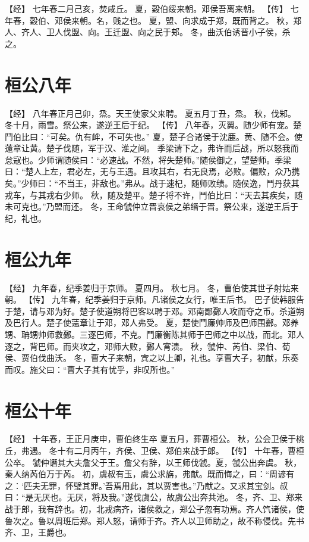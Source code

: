 \documentclass[a4paper,12pt,UTF8,twoside]{ctexbook}
\begin{document}
【经】
七年春二月己亥，焚咸丘。
夏，穀伯绥来朝。邓侯吾离来朝。
【传】
七年春，穀伯、邓侯来朝。名，贱之也。
夏，盟、向求成于郑，既而背之。
秋，郑人、齐人、卫人伐盟、向。王迁盟、向之民于郏。
冬，曲沃伯诱晋小子侯，杀之。

\section{桓公八年}

【经】
八年春正月己卯，烝。天王使家父来聘。
夏五月丁丑，烝。
秋，伐邾。
冬十月，雨雪。祭公来，遂逆王后于纪。
【传】
八年春，灭翼。随少师有宠。楚鬥伯比曰：“可矣。仇有衅，不可失也。”
夏，楚子合诸侯于沈鹿。黄、随不会。使薳章让黄。楚子伐随，军于汉、淮之间。
季梁请下之，弗许而后战，所以怒我而怠寇也。少师谓随侯曰：“必速战。不然，将失楚师。”随侯御之，望楚师。季梁曰：“楚人上左，君必左，无与王遇。且攻其右，右无良焉，必败。偏败，众乃携矣。”少师曰：“不当王，非敌也。”弗从。战于速杞，随师败绩。随侯逸，鬥丹获其戎车，与其戎右少师。
秋，随及楚平。楚子将不许，鬥伯比曰：“天去其疾矣，随未可克也。”乃盟而还。
冬，王命虢仲立晋哀侯之弟缗于晋。祭公来，遂逆王后于纪，礼也。

\section{桓公九年}

【经】
九年春，纪季姜归于京师。
夏四月。
秋七月。
冬，曹伯使其世子射姑来朝。
【传】
九年春，纪季姜归于京师。凡诸侯之女行，唯王后书。
巴子使韩服告于楚，请与邓为好。楚子使道朔将巴客以聘于邓。邓南鄙鄾人攻而夺之币。杀道朔及巴行人。楚子使薳章让于邓，邓人弗受。
夏，楚使鬥廉帅师及巴师围鄾。邓养甥、聃甥帅师救鄾。三逐巴师，不克。鬥廉衡陈其师于巴师之中以战，而北。邓人逐之，背巴师。而夹攻之，邓师大败，鄾人宵溃。
秋，虢仲、芮伯、梁伯、荀侯、贾伯伐曲沃。
冬，曹大子来朝，宾之以上卿，礼也。享曹大子，初献，乐奏而叹。施父曰：“曹大子其有忧乎，非叹所也。”

\section{桓公十年}

【经】
十年春，王正月庚申，曹伯终生卒
夏五月，葬曹桓公。
秋，公会卫侯于桃丘，弗遇。
冬十有二月丙午，齐侯、卫侯、郑伯来战于郎。
【传】
十年春，曹桓公卒。
虢仲谮其大夫詹父于王。詹父有辞，以王师伐虢。夏，虢公出奔虞。
秋，秦人纳芮伯万于芮。
初，虞叔有玉，虞公求旃，弗献。既而悔之，曰：“周谚有之：‘匹夫无罪，怀璧其罪。’吾焉用此，其以贾害也。”乃献之。又求其宝剑。叔曰：“是无厌也。无厌，将及我。”遂伐虞公，故虞公出奔共池。
冬，齐、卫、郑来战于郎，我有辞也。初，北戎病齐，诸侯救之，郑公子忽有功焉。齐人饩诸侯，使鲁次之。鲁以周班后郑。郑人怒，请师于齐。齐人以卫师助之，故不称侵伐。先书齐、卫，王爵也。
\end{document}
